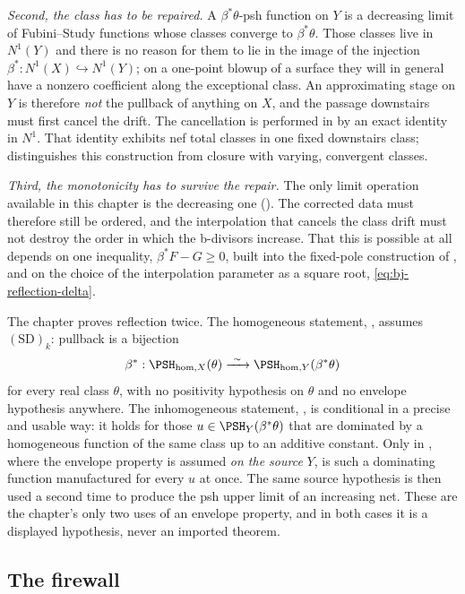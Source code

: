 \emph{Second, the class has to be repaired.}  A $\beta^*\theta$-psh
function on $Y$ is a decreasing limit of Fubini--Study functions whose
classes converge to $\beta^*\theta$.  Those classes live in $N^1(Y)$ and
there is no reason for them to lie in the image of the injection
$\beta^*:N^1(X)\hookrightarrow N^1(Y)$; on a one-point blowup of a surface
they will in general have a nonzero coefficient along the exceptional class.
An approximating stage on $Y$ is therefore \emph{not} the pullback of
anything on $X$, and the passage downstairs must first cancel the drift.
The cancellation is performed in  by an exact
identity in $N^1$.  That identity exhibits nef total classes in one fixed
downstairs class;  distinguishes this
construction from closure with varying, convergent classes.

\emph{Third, the monotonicity has to survive the repair.}  The only limit
operation available in this chapter is the decreasing one
().  The corrected data must therefore still be
ordered, and the interpolation that cancels the class drift must not destroy
the order in which the b-divisors increase.  That this is possible at all
depends on one inequality, $\beta^*F-G\ge0$, built into the fixed-pole
construction of , and on the choice of the
interpolation parameter as a square root, \eqref{eq:bj-reflection-delta}.

The chapter proves reflection twice.  The homogeneous statement,
, assumes $\mathrm{(SD)}_k$: pullback is a
bijection
\[
 \beta^*:\PSH_{\mathrm{hom},X}(\theta)
 \xrightarrow{\ \sim\ }\PSH_{\mathrm{hom},Y}(\beta^*\theta)
\]
for every real class $\theta$, with no positivity hypothesis on
$\theta$ and no envelope hypothesis anywhere.  The inhomogeneous
statement, , is conditional in a precise and
usable way: it holds for those $u\in\PSH_Y(\beta^*\theta)$ that are
dominated by a homogeneous function of the same class up to an additive
constant.  Only in , where the envelope property is
assumed \emph{on the source} $Y$, is such a dominating function
manufactured for every $u$ at once.  The same source hypothesis is then
used a second time to produce the psh upper limit of an increasing net.
These are the chapter's only two uses of an envelope property, and in both
cases it is a displayed hypothesis, never an imported theorem.

\subsection{The firewall}
\label{sec:ch39-firewall}

